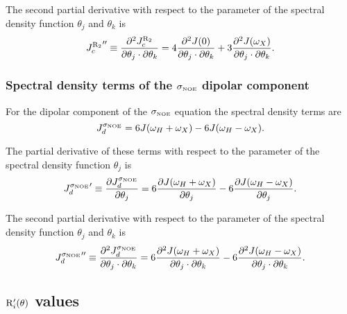 \noindent The second partial derivative with respect to the parameter of the spectral density function $\theta_j$ and $\theta_k$ is
\begin{equation}
    {J_c^{\mathrm{R}_2}}'' \equiv \frac{\partial^2 J_c^{\mathrm{R}_2}}{\partial \theta_j \cdot \partial \theta_k}
        = 4 \frac{\partial^2 J(0)}{\partial \theta_j \cdot \partial \theta_k}
        + 3 \frac{\partial^2 J(\omega_X)}{\partial \theta_j \cdot \partial \theta_k}.  \label{eq: J terms: JR2c"}
\end{equation}


\subsubsection{Spectral density terms of the $\sigma_{\scriptscriptstyle \mathrm{NOE}}$ dipolar component}

For the dipolar component of the $\sigma_{\scriptscriptstyle \mathrm{NOE}}$ equation the spectral density terms are
\begin{equation}
    J_d^{\sigma_{\scriptscriptstyle \mathrm{NOE}}} = 6J(\omega_H + \omega_X) - 6J(\omega_H - \omega_X).  \label{eq: J terms: JsigmaNOEd}
\end{equation}

\noindent The partial derivative of these terms with respect to the parameter of the spectral density function $\theta_j$ is
\begin{equation}
    {J_d^{\sigma_{\scriptscriptstyle \mathrm{NOE}}}}' \equiv \frac{\partial J_d^{\sigma_{\scriptscriptstyle \mathrm{NOE}}}}{\partial \theta_j}
        = 6 \frac{\partial J(\omega_H + \omega_X)}{\partial \theta_j}
        - 6 \frac{\partial J(\omega_H - \omega_X)}{\partial \theta_j}.  \label{eq: J terms: JsigmaNOEd'}
\end{equation}

\noindent The second partial derivative with respect to the parameter of the spectral density function $\theta_j$ and $\theta_k$ is
\begin{equation}
    {J_d^{\sigma_{\scriptscriptstyle \mathrm{NOE}}}}'' \equiv \frac{\partial^2 J_d^{\sigma_{\scriptscriptstyle \mathrm{NOE}}}}{\partial \theta_j \cdot \partial \theta_k}
        = 6 \frac{\partial^2 J(\omega_H + \omega_X)}{\partial \theta_j \cdot \partial \theta_k}
        - 6 \frac{\partial^2 J(\omega_H - \omega_X)}{\partial \theta_j \cdot \partial \theta_k}.  \label{eq: J terms: JsigmaNOEd"}
\end{equation}




\subsection{$\mathrm{R}_i'(\theta)$ values}

